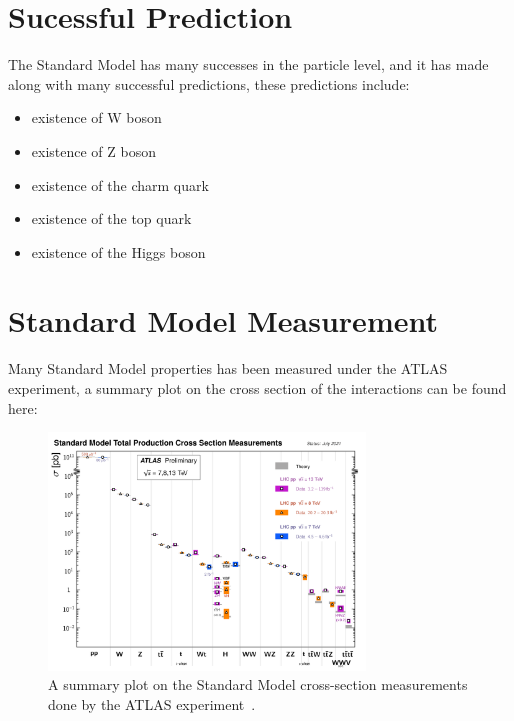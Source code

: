 \section{Sucessful Prediction}
The Standard Model has many successes in the particle level, and it has made along with many successful predictions, these predictions include:
    \begin{itemize}
        \item existence of W boson %
        \item existence of Z boson %
        \item existence of the charm quark %
        \item existence of the top quark %
        \item existence of the Higgs boson %
    \end{itemize}

\section{Standard Model Measurement}
Many Standard Model properties has been measured under the ATLAS experiment, a summary plot on the cross section of the interactions can be found here:

    \begin{figure}[!htb]
        \begin{center}
            \includegraphics[width=0.75\textwidth]{figures/chapter_SM/SM_Measurement}
            \caption{
                A summary plot on the Standard Model cross-section measurements done by the ATLAS experiment~\cite{ATL-PHYS-PUB-2021-032}.
            }
            \label{fig:SM}

        \end{center}
    \end{figure}



